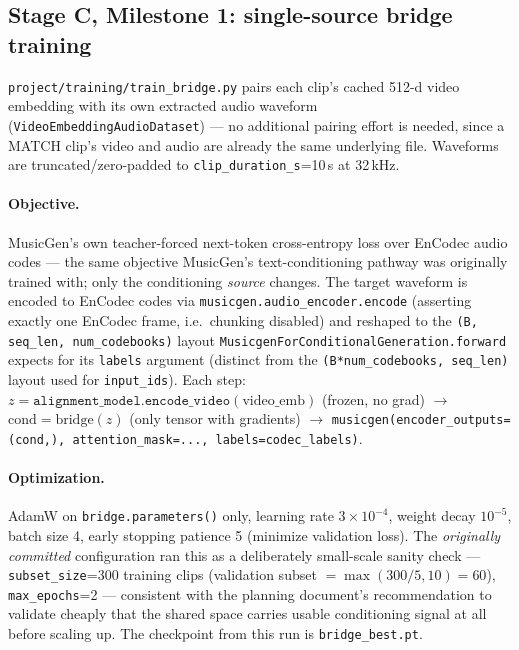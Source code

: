 \documentclass[11pt]{article}
\begin{document}
\subsection{Stage C, Milestone 1: single-source bridge training}
\label{sec:train-stageC}
\texttt{project/training/train\_bridge.py} pairs each clip's cached 512-d video embedding with its
own extracted audio waveform (\texttt{VideoEmbeddingAudioDataset}) --- no additional pairing effort
is needed, since a MATCH clip's video and audio are already the same underlying file. Waveforms are
truncated/zero-padded to \texttt{clip\_duration\_s}=10\,s at 32\,kHz.

\paragraph{Objective.} MusicGen's own teacher-forced next-token cross-entropy loss over EnCodec
audio codes --- the same objective MusicGen's text-conditioning pathway was originally trained
with; only the conditioning \emph{source} changes. The target waveform is encoded to EnCodec codes
via \texttt{musicgen.audio\_encoder.encode} (asserting exactly one EnCodec frame, i.e.\ chunking
disabled) and reshaped to the \texttt{(B, seq\_len, num\_codebooks)} layout
\texttt{MusicgenForConditionalGeneration.forward} expects for its \texttt{labels} argument (distinct
from the \texttt{(B*num\_codebooks, seq\_len)} layout used for \texttt{input\_ids}). Each step:
$z=\texttt{alignment\_model.encode\_video}(\text{video\_emb})$ (frozen, no grad)
$\to$ $\text{cond}=\text{bridge}(z)$ (only tensor with gradients) $\to$
\texttt{musicgen(encoder\_outputs=(cond,), attention\_mask=..., labels=codec\_labels)}.

\paragraph{Optimization.} AdamW on \texttt{bridge.parameters()} only, learning rate $3\times10^{-4}$,
weight decay $10^{-5}$, batch size 4, early stopping patience 5 (minimize validation loss). The
\emph{originally committed} configuration ran this as a deliberately small-scale sanity check ---
\texttt{subset\_size}=300 training clips (validation subset $=\max(300/5,10)=60$), \texttt{max\_epochs}=2
--- consistent with the planning document's recommendation to validate cheaply that the shared
space carries usable conditioning signal at all before scaling up. The checkpoint from this run is
\texttt{bridge\_best.pt}.
\end{document}
